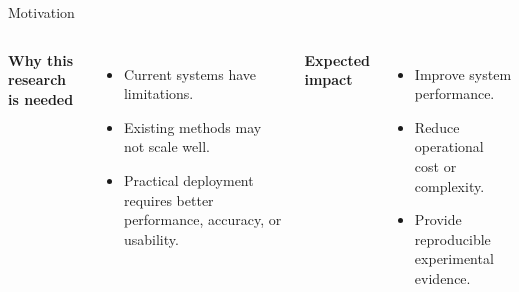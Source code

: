 \begin{frame}{Motivation}

\begin{columns}[T,onlytextwidth]

\textbf{Why this research is needed}

\vspace{0.30cm}

\begin{itemize}
    \item Current systems have limitations.
    \item Existing methods may not scale well.
    \item Practical deployment requires better performance, accuracy, or usability.
\end{itemize}

\textbf{Expected impact}

\vspace{0.30cm}

\begin{itemize}
    \item Improve system performance.
    \item Reduce operational cost or complexity.
    \item Provide reproducible experimental evidence.
\end{itemize}

\end{columns}

\end{frame}
